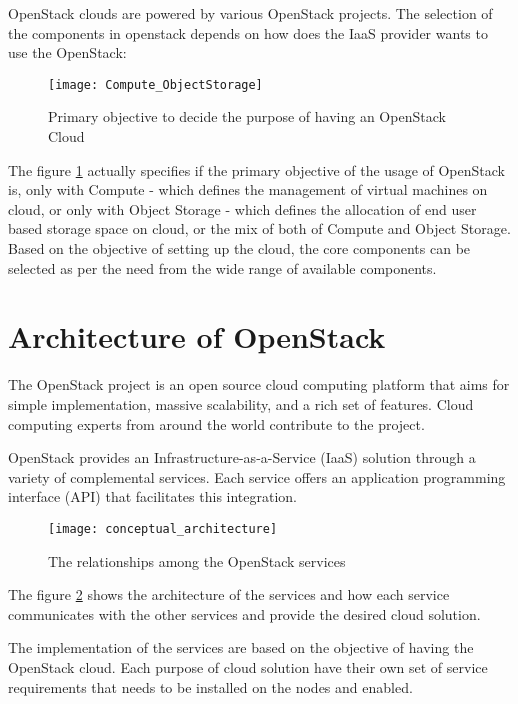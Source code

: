 OpenStack clouds are powered by various OpenStack projects.
The selection of the components in openstack depends on how does the IaaS provider wants to use the OpenStack:

\begin{figure}[H]
  \centering
  \texttt{[image: Compute\_ObjectStorage]}
  \caption{Primary objective to decide the purpose of having an OpenStack Cloud\cite{OpenStack}}\label{fig:Compute_ObjectStorage}
\end{figure}

The figure \ref{fig:Compute_ObjectStorage} actually specifies if the primary objective of the usage of OpenStack is, only with Compute - which defines the management of virtual machines on cloud, or only with Object Storage - which defines the allocation of end user based storage space on cloud, or the mix of both of Compute and Object Storage. Based on the objective of setting up the cloud, the core components can be selected as per the need from the wide range of available components.

\section{Architecture of OpenStack}\label{sec:architecture}
The OpenStack project is an open source cloud computing platform that aims for simple implementation, massive scalability, and a rich set of features. Cloud computing experts from around the world contribute to the project.

OpenStack provides an Infrastructure-as-a-Service (IaaS) solution through a variety of complemental services. Each service offers an application programming interface (API) that facilitates this integration.

\begin{figure}[H]
	\begin{center}
		\texttt{[image: conceptual\_architecture]}
		\caption{The relationships among the OpenStack services}\label{fig:openstack_architecture}
	\end{center}
	\vspace{-10pt}
\end{figure}

The figure \ref{fig:openstack_architecture} shows the architecture of the services and how each service communicates with the other services and provide the desired cloud solution.

The implementation of the services are based on the objective of having the OpenStack cloud.
Each purpose of cloud solution have their own set of service requirements that needs to be installed on the nodes and enabled.

